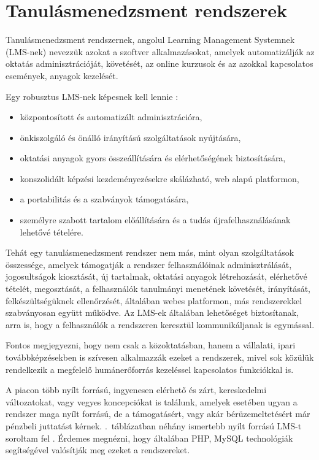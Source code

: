 \chapter{Tanulásmenedzsment rendszerek}
Tanulásmenedzsment rendszernek, angolul Learning Management Systemnek (LMS-nek) nevezzük azokat a szoftver alkalmazásokat, amelyek automatizálják az oktatás adminisztrációját, követését, az online kurzusok és az azokkal kapcsolatos események, anyagok kezelését.

Egy robusztus LMS-nek képesnek kell lennie \cite{link:ell}:
\begin{itemize}
\setlength{\itemsep}{0pt}
\item központosított és automatizált adminisztrációra,
\item önkiszolgáló és önálló irányítású szolgáltatások nyújtására,
\item oktatási anyagok gyors összeállítására és elérhetőségének biztosítására,
\item konszolidált képzési kezdeményezésekre skálázható, web alapú platformon,
\item a portabilitás és a szabványok támogatására,
\item személyre szabott tartalom előállítására és a tudás újrafelhasználásának lehetővé tételére.
\end{itemize}

Tehát egy tanulásmenedzsment rendszer nem más, mint olyan szolgáltatások összessége, amelyek támogatják a rendszer felhasználóinak adminisztrálását, jogosultságok kiosztását, új tartalmak, oktatási anyagok létrehozását, elérhetővé tételét, megosztását, a felhasználók tanulmányi menetének követését, irányítását, felkészültségüknek ellenőrzését, általában webes platformon, más rendszerekkel szabványosan együtt működve. Az LMS-ek általában lehetőséget biztosítanak, arra is, hogy a felhasználók a rendszeren keresztül kommunikáljanak is egymással.

Fontos megjegyezni, hogy nem csak a közoktatásban, hanem a vállalati, ipari továbbképzésekben is szívesen alkalmazzák ezeket a rendszerek, mivel sok közülük rendelkezik a megfelelő humánerőforrás kezeléssel kapcsolatos funkciókkal is.

A piacon több nyílt forrású, ingyenesen elérhető és zárt, kereskedelmi változatokat, vagy vegyes koncepciókat is találunk, amelyek esetében ugyan a rendszer maga nyílt forrású, de a támogatásért, vagy akár bérüzemeltetésért már pénzbeli juttatást kérnek. .~táblázatban néhány ismertebb nyílt forrású LMS-t soroltam fel \cite{link:lms}. Érdemes megnézni, hogy általában PHP, MySQL technológiák segítségével valósítják meg ezeket a rendszereket.

